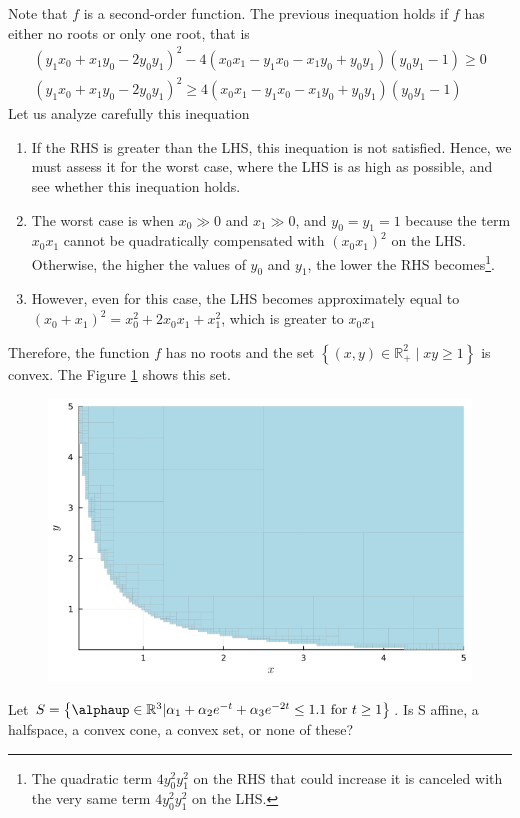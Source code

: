 \documentclass[12pt,a4paper]{article}
\begin{document}
Note that \(f\) is a second-order function. The previous inequation holds if \(f\) has either no roots or only one root, that is
\begin{align}
    (y_1 x_0 + x_1 y_0 - 2y_0 y_1)^2 - 4(x_0 x_1 - y_1 x_0 - x_1 y_0 + y_0 y_1 )(y_0 y_1 - 1) \geq 0 \\
    (y_1 x_0 + x_1 y_0 - 2y_0 y_1)^2 \geq 4(x_0 x_1 - y_1 x_0 - x_1 y_0 + y_0 y_1 )(y_0 y_1 - 1)
\end{align}
Let us analyze carefully this inequation
\begin{enumerate}
    \item If the RHS is greater than the LHS, this inequation is not satisfied. Hence, we must assess it for the worst case, where the LHS is as high as possible, and see whether this inequation holds.
    \item The worst case is when \(x_0 \gg 0\) and \(x_1 \gg 0\), and \(y_0=y_1=1\) because the term \(x_0 x_1\) cannot be quadratically compensated with \((x_0 x_1)^2\) on the LHS. Otherwise, the higher the values of \(y_0\) and \(y_1\), the lower the RHS becomes\footnote{The quadratic term \(4y_0^2 y_1^2\) on the RHS that could increase it is canceled with the very same term \(4y_0^2 y_1^2\) on the LHS.}.
    \item However, even for this case, the LHS becomes approximately equal to \((x_0 + x_1)^2 = x_0^2 + 2x_0x_1 + x_1^2\), which is greater to \(x_0x_1\)
\end{enumerate}

Therefore, the function \(f\) has no roots and the set \(\left\{ (x,y) \in \mathbb{R}_{+}^{2} \mid xy \geq 1 \right\}\) is convex. The Figure \ref{fig:28d} shows this set.
\begin{figure}[H]
    \centering
    \includegraphics[scale=0.4]{figs/2.8d.png}
    \label{fig:28d}
\end{figure}


\problem

Let \(S = \left\{\boldsymbol{\alphaup} \in \mathbb{R}^3 | \alpha_1 + \alpha_2e^{-t} + \alpha_3e^{-2t} \leq 1.1\text{ for }t \geq 1\right\}\). Is S affine, a halfspace, a convex cone, a convex set, or none of these?
\end{document}
